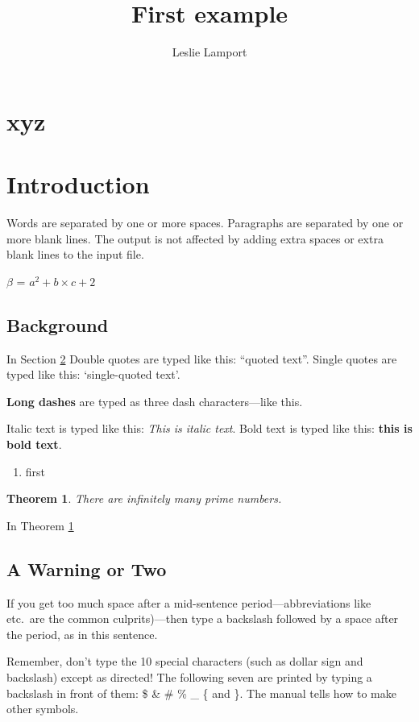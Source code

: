 \documentclass[11pt]{article}  %
\newtheorem{theorem}{Theorem}[section]
\begin{document}
  
\title{First example}
\author{Leslie Lamport}
\maketitle
\section{xyz}
\section{Introduction}\label{intro}          %

Words are separated by one or    more      spaces.  Paragraphs are
    separated by one or more blank lines.  The output is not affected
by adding extra spaces or extra blank lines to the input file.

{\large $\beta$ = $a^2 + b\times c +2$}

\subsection{Background}
In Section \ref{intro} Double quotes are typed like this: ``quoted text''.
Single quotes are typed like this: `single-quoted text'.

\textbf{Long dashes} are typed as three dash characters---like this.

Italic text is typed like this: \textit{This is italic text}.
Bold   text is typed like this: \textbf{this is  bold  text}.

\begin{enumerate}
    \item first 
\end{enumerate}

\begin{theorem}\label{T1}
     There are infinitely many prime numbers.
\end{theorem}
   

In Theorem \ref{T1}   





\subsection{A Warning or Two}        %

If you get too much space after a mid-sentence period---abbreviations
like etc.\ are the common culprits)---then type a backslash followed by
a space after the period, as in this sentence.

\noindent Remember, don't type the 10 special characters (such as dollar sign and
backslash) except as directed!  The following seven are printed by
typing a backslash in front of them:  \$  \&  \#  \%  \_  \{  and  \}.
The manual tells how to make other symbols.
\end{document}
